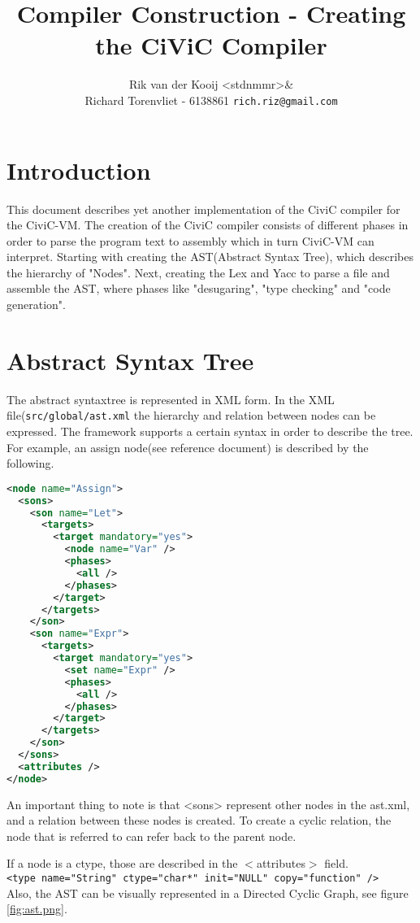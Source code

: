 \documentclass[a4paper]{article}
\author{Rik van der Kooij <stdnmmr>\& \\
Richard Torenvliet - 6138861 \texttt{rich.riz@gmail.com}}
\title{Compiler Construction - Creating the CiViC Compiler}
\begin{document}
\tableofcontents
\maketitle

\section{Introduction}
This document describes yet another implementation of the CiviC compiler for
the CiviC-VM.  The creation of the CiviC compiler consists of different phases
in order to parse the program text to assembly which in turn CiviC-VM can
interpret. Starting with creating the AST(Abstract Syntax Tree), which
describes the hierarchy of "Nodes". Next, creating the Lex and Yacc to parse a
file and assemble the AST, where phases like "desugaring", "type checking" and
"code generation".

\section{Abstract Syntax Tree}
The abstract syntaxtree is represented in XML form. In the XML
file(\texttt{src/global/ast.xml} the hierarchy and relation between nodes can be
expressed. The framework supports a certain syntax in order to describe the
tree. For example, an assign node(see reference document) is described by the following.

\begin{lstlisting}[language=XML]
 <node name="Assign">
  <sons>
    <son name="Let">
      <targets>
        <target mandatory="yes">
          <node name="Var" />
          <phases>
            <all />
          </phases>
        </target>
      </targets>
    </son>
    <son name="Expr">
      <targets>
        <target mandatory="yes">
          <set name="Expr" />
          <phases>
            <all />
          </phases>
        </target>
      </targets>
    </son>
  </sons>
  <attributes />
</node>
\end{lstlisting}

An important thing to note is that <sons> represent other nodes in the ast.xml,
and a relation between these nodes is created. To create a cyclic
relation, the node that is referred to can refer back to the parent node.

If a node is a ctype, those are described in the $\lt$attributes$\gt$ field.\\
\texttt{<type name="String" ctype="char*" init="NULL" copy="function" />}
\\
Also, the AST can be visually represented in a Directed Cyclic Graph, see
figure \ref{fig:ast.png}.
\end{document}
